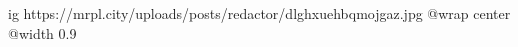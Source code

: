  
 
 
 
 

\ifcmt
  ig https://mrpl.city/uploads/posts/redactor/dlghxuehbqmojgaz.jpg
  @wrap center
  @width 0.9
\fi
